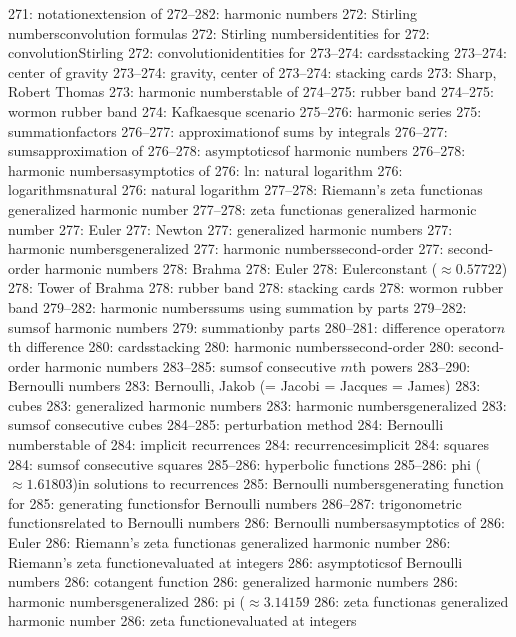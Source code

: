 271: notation\sub extension of
272--282: harmonic numbers
272: Stirling numbers\sub convolution formulas
272: Stirling numbers\sub identities for
272: convolution\sub Stirling
272: convolution\sub identities for
273--274: cards\sub stacking
273--274: center of gravity
273--274: gravity, center of
273--274: stacking cards
273: Sharp, Robert Thomas
273: harmonic numbers\sub table of
274--275: rubber band
274--275: worm\sub on rubber band
274: Kafkaesque scenario
275--276: harmonic series
275: summation\sub factors
276--277: approximation\sub of sums by integrals
276--277: sums\sub approximation of
276--278: asymptotics\sub of harmonic numbers
276--278: harmonic numbers\sub asymptotics of
276: ln: natural logarithm
276: logarithms\sub natural
276: natural logarithm
277--278: Riemann's zeta function\sub as generalized harmonic number
277--278: zeta function\sub as generalized harmonic number
277: Euler
277: Newton
277: generalized harmonic numbers
277: harmonic numbers\sub generalized
277: harmonic numbers\sub second-order
277: second-order harmonic numbers
278: Brahma
278: Euler
278: Euler\sub constant ($\approx0.57722$)
278: Tower of Brahma
278: rubber band
278: stacking cards
278: worm\sub on rubber band
279--282: harmonic numbers\sub sums using summation by parts
279--282: sums\sub of harmonic numbers
279: summation\sub by parts
280--281: difference operator\sub $n$th difference
280: cards\sub stacking
280: harmonic numbers\sub second-order
280: second-order harmonic numbers
283--285: sums\sub of consecutive $m$th powers
283--290: Bernoulli numbers
283: Bernoulli, Jakob (= Jacobi = Jacques = James)
283: cubes
283: generalized harmonic numbers
283: harmonic numbers\sub generalized
283: sums\sub of consecutive cubes
284--285: perturbation method
284: Bernoulli numbers\sub table of
284: implicit recurrences
284: recurrences\sub implicit
284: squares
284: sums\sub of consecutive squares
285--286: hyperbolic functions
285--286: phi ($\approx1.61803$)\sub in solutions to recurrences
285: Bernoulli numbers\sub generating function for
285: generating functions\sub for Bernoulli numbers
286--287: trigonometric functions\sub related to Bernoulli numbers
286: Bernoulli numbers\sub asymptotics of
286: Euler
286: Riemann's zeta function\sub as generalized harmonic number
286: Riemann's zeta function\sub evaluated at integers
286: asymptotics\sub of Bernoulli numbers
286: cotangent function
286: generalized harmonic numbers
286: harmonic numbers\sub generalized
286: pi ($\approx3.14159$
286: zeta function\sub as generalized harmonic number
286: zeta function\sub evaluated at integers
